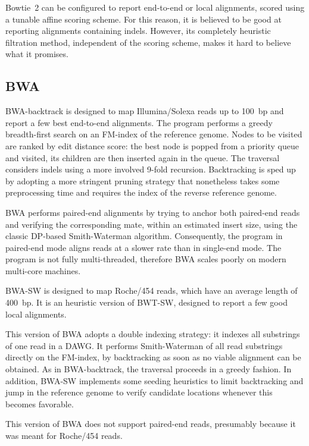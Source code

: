 Bowtie~2 can be configured to report end-to-end or local alignments, scored using a tunable affine scoring scheme.
For this reason, it is believed to be good at reporting alignments containing indels.
However, its completely heuristic filtration method, independent of the scoring scheme, makes it hard to believe what it promises.


\subsection{BWA}

BWA-backtrack \citep{BWA} is designed to map Illumina/Solexa reads up to 100~bp and report a few best end-to-end alignments.
The program performs a greedy breadth-first search on an FM-index of the reference genome.
Nodes to be visited are ranked by edit distance score: the best node is popped from a priority queue and visited, its children are then inserted again in the queue.
The traversal considers indels using a more involved 9-fold recursion.
Backtracking is sped up by adopting a more stringent pruning strategy that nonetheless takes some preprocessing time and requires the index of the reverse reference genome.

BWA performs paired-end alignments by trying to anchor both paired-end reads and verifying the corresponding mate, within an estimated insert size, using the classic DP-based Smith-Waterman algorithm.
Consequently, the program in paired-end mode aligns reads at a slower rate than in single-end mode.
The program is not fully multi-threaded, therefore BWA scales poorly on modern multi-core machines.

BWA-SW \citep{BWA-SW} is designed to map Roche/454 reads, which have an average length of 400~bp.
It is an heuristic version of BWT-SW, designed to report a few good local alignments.

This version of BWA adopts a double indexing strategy: it indexes all substrings of one read in a DAWG.
It performs Smith-Waterman of all read substrings directly on the FM-index, by backtracking as soon as no viable alignment can be obtained.
As in BWA-backtrack, the traversal proceeds in a greedy fashion.
In addition, BWA-SW implements some seeding heuristics to limit backtracking and jump in the reference genome to verify candidate locations whenever this becomes favorable.

This version of BWA does not support paired-end reads, presumably because it was meant for Roche/454 reads.

